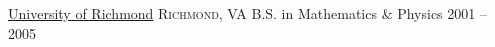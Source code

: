 \documentclass[10pt,a4paper]{article}
\begin{document}
\headedsection
  {\href{http://www.richmond.edu/}{University of Richmond}}
  {\textsc{Richmond, VA}} {%
  \headedsubsection
    {B.S. in Mathematics \& Physics}
    {2001 -- 2005}
    {}
}















\end{document}
